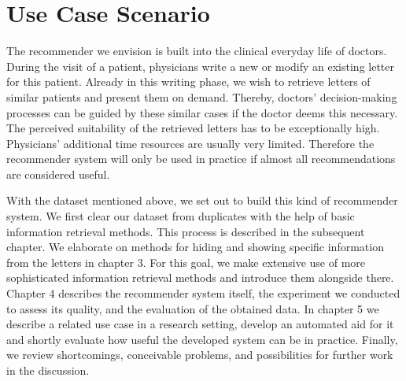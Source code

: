 \section{Use Case Scenario}
The recommender we envision is built into the clinical everyday life of doctors. During the visit of a patient, physicians write a new or modify an existing letter for this patient. Already in this writing phase, we wish to retrieve letters of similar patients and present them on demand. Thereby, doctors' decision-making processes can be guided by these similar cases if the doctor deems this necessary. The perceived suitability of the retrieved letters has to be exceptionally high. Physicians' additional time resources are usually very limited. Therefore the recommender system will only be used in practice if almost all recommendations are considered useful.

With the dataset mentioned above, we set out to build this kind of recommender system. We first clear our dataset from duplicates with the help of basic information retrieval methods. This process is described in the subsequent chapter. We elaborate on methods for hiding and showing specific information from the letters in chapter 3. For this goal, we make extensive use of more sophisticated information retrieval methods and introduce them alongside there. Chapter 4 describes the recommender system itself, the experiment we conducted to assess its quality, and the evaluation of the obtained data. In chapter 5 we describe a related use case in a research setting, develop an automated aid for it and shortly evaluate how useful the developed system can be in practice. Finally, we review shortcomings, conceivable problems, and possibilities for further work in the discussion.

